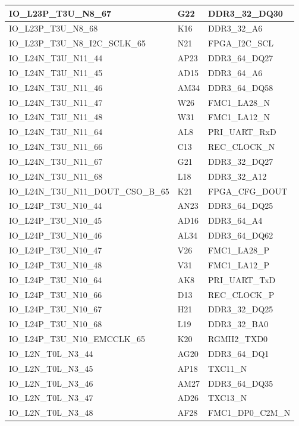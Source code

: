 \begin{footnotesize}
\begin{longtable}{|p{7cm}|p{1cm}|p{5cm}|}
IO\_L23P\_T3U\_N8\_67	&	G22	&	DDR3\_32\_DQ30	\\ \hline
IO\_L23P\_T3U\_N8\_68	&	K16	&	DDR3\_32\_A6	\\ \hline
IO\_L23P\_T3U\_N8\_I2C\_SCLK\_65	&	N21	&	FPGA\_I2C\_SCL	\\ \hline
IO\_L24N\_T3U\_N11\_44	&	AP23	&	DDR3\_64\_DQ27	\\ \hline
IO\_L24N\_T3U\_N11\_45	&	AD15	&	DDR3\_64\_A6	\\ \hline
IO\_L24N\_T3U\_N11\_46	&	AM34	&	DDR3\_64\_DQ58	\\ \hline
IO\_L24N\_T3U\_N11\_47	&	W26	&	FMC1\_LA28\_N	\\ \hline
IO\_L24N\_T3U\_N11\_48	&	W31	&	FMC1\_LA12\_N	\\ \hline
IO\_L24N\_T3U\_N11\_64	&	AL8	&	PRI\_UART\_RxD	\\ \hline
IO\_L24N\_T3U\_N11\_66	&	C13	&	REC\_CLOCK\_N	\\ \hline
IO\_L24N\_T3U\_N11\_67	&	G21	&	DDR3\_32\_DQ27	\\ \hline
IO\_L24N\_T3U\_N11\_68	&	L18	&	DDR3\_32\_A12	\\ \hline
IO\_L24N\_T3U\_N11\_DOUT\_CSO\_B\_65	&	K21	&	FPGA\_CFG\_DOUT	\\ \hline
IO\_L24P\_T3U\_N10\_44	&	AN23	&	DDR3\_64\_DQ25	\\ \hline
IO\_L24P\_T3U\_N10\_45	&	AD16	&	DDR3\_64\_A4	\\ \hline
IO\_L24P\_T3U\_N10\_46	&	AL34	&	DDR3\_64\_DQ62	\\ \hline
IO\_L24P\_T3U\_N10\_47	&	V26	&	FMC1\_LA28\_P	\\ \hline
IO\_L24P\_T3U\_N10\_48	&	V31	&	FMC1\_LA12\_P	\\ \hline
IO\_L24P\_T3U\_N10\_64	&	AK8	&	PRI\_UART\_TxD	\\ \hline
IO\_L24P\_T3U\_N10\_66	&	D13	&	REC\_CLOCK\_P	\\ \hline
IO\_L24P\_T3U\_N10\_67	&	H21	&	DDR3\_32\_DQ25	\\ \hline
IO\_L24P\_T3U\_N10\_68	&	L19	&	DDR3\_32\_BA0	\\ \hline
IO\_L24P\_T3U\_N10\_EMCCLK\_65	&	K20	&	RGMII2\_TXD0	\\ \hline
IO\_L2N\_T0L\_N3\_44	&	AG20	&	DDR3\_64\_DQ1	\\ \hline
IO\_L2N\_T0L\_N3\_45	&	AP18	&	TXC11\_N	\\ \hline
IO\_L2N\_T0L\_N3\_46	&	AM27	&	DDR3\_64\_DQ35	\\ \hline
IO\_L2N\_T0L\_N3\_47	&	AD26	&	TXC13\_N	\\ \hline
IO\_L2N\_T0L\_N3\_48	&	AF28	&	FMC1\_DP0\_C2M\_N	\\ \hline

\end{longtable}
\end{footnotesize}
